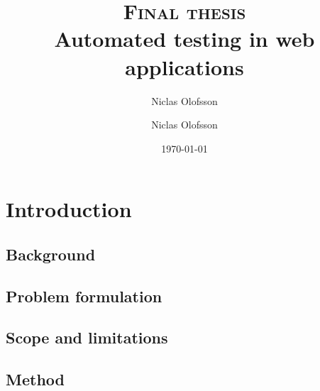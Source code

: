 \documentclass[a4paper]{report}
\author{Niclas Olofsson}
\title{\textsc{Final thesis}\\\textbf{Automated testing in web applications}}
\author{Niclas Olofsson}
\date{\today}
\begin{document}
\maketitle
\newpage

\begin{abstract}

\end{abstract}

\renewcommand{\abstractname}{Acknowledgments}
\begin{abstract}

\end{abstract}

\tableofcontents
\thispagestyle{empty} %
\newpage

\setcounter{page}{1}

\chapter{Introduction}

    \section{Background}
    

    \section{Problem formulation}
    

    \section{Scope and limitations}
    

    \section{Method}
    




\end{document}
